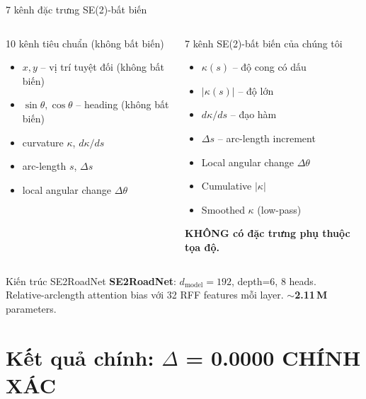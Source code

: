 \documentclass[aspectratio=169,10pt]{beamer}
\begin{document}
\begin{frame}{7 kênh đặc trưng SE(2)-bất biến}
\begin{columns}[T]
\begin{block}{10 kênh tiêu chuẩn (không bất biến)}
\scriptsize
\begin{itemize}
  \item $x, y$ -- vị trí tuyệt đối (\textcolor{alert}{không bất biến})
  \item $\sin\theta, \cos\theta$ -- heading (\textcolor{alert}{không bất biến})
  \item curvature $\kappa$, $d\kappa/ds$
  \item arc-length $s$, $\Delta s$
  \item local angular change $\Delta\theta$
\end{itemize}
\end{block}

\begin{exampleblock}{7 kênh SE(2)-bất biến của chúng tôi}
\scriptsize
\begin{itemize}
  \item $\kappa(s)$ -- độ cong có dấu
  \item $|\kappa(s)|$ -- độ lớn
  \item $d\kappa/ds$ -- đạo hàm
  \item $\Delta s$ -- arc-length increment
  \item Local angular change $\Delta\theta$
  \item Cumulative $|\kappa|$
  \item Smoothed $\kappa$ (low-pass)
\end{itemize}
\textbf{KHÔNG có đặc trưng phụ thuộc tọa độ.}
\end{exampleblock}
\end{columns}

\begin{block}{Kiến trúc SE2RoadNet}
\scriptsize
\textbf{SE2RoadNet}: $d_{\text{model}}=192$, depth=6, 8 heads. \\
Relative-arclength attention bias với 32 RFF features mỗi layer.
$\sim$\textbf{2.11\,M} parameters.
\end{block}
\end{frame}

\section{Kết quả chính: $\Delta$ = 0.0000 CHÍNH XÁC}
\end{document}
